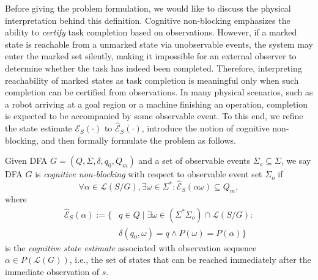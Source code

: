 \documentclass[journal,twoside,web]{ieeecolor}
\begin{document}
Before giving the problem formulation, we would like to discuss the physical interpretation behind this definition.
Cognitive non-blocking emphasizes the ability to \emph{certify} task completion based on observations.
%
However, if a marked state is reachable from a unmarked state via unobservable events, the system may enter the marked set silently, making it impossible for an external observer to determine whether the task has indeed been completed.
Therefore, interpreting reachability of marked states as task completion is meaningful only when such completion can be certified from observations.
% 
In many physical scenarios, such as a robot arriving at a goal region or a machine finishing an operation, completion is expected to be accompanied by some observable event.
%
To this end, we refine the state estimate $\mathcal{E}_S(\cdot)$ to $\hat{\mathcal{E}}_S(\cdot)$, introduce the notion of cognitive non-blocking, and then formally formulate the problem as follows.
%
\begin{definition}%
    \label{def:cnb}
    Given DFA $G = (Q, \Sigma, \delta, q_0, Q_m)$ and a set of observable events $\Sigma_o \subseteq \Sigma$, we say DFA $G$ is \textit{cognitive non-blocking} with respect to observable event set $\Sigma_o$ if
    \begin{equation}\label{eq:cnb_1}
    \forall \alpha \in \mathcal{L}(S/G), \exists \omega \in \Sigma^* : \hat{\mathcal{E}}_S(\alpha \omega) \subseteq Q_m,
    \end{equation}
    where
    \begin{equation}\label{eq:est_o}
    \begin{aligned}
    \hat{\mathcal{E}}_S(\alpha) := \{ 
    &q \in Q \mid \exists \omega \in (\Sigma^*\Sigma_o) \cap \mathcal{L}(S / G) : \\ 
    &\delta(q_0, \omega) = q \wedge P(\omega) = P(\alpha) \}
    \end{aligned}
    \end{equation}
    is the \emph{cognitive state estimate} associated with observation sequence $\alpha \in P(\mathcal{L}(G))$, i.e., the set of states that can be reached immediately after the immediate observation of $s$.
\end{definition}
\end{document}
